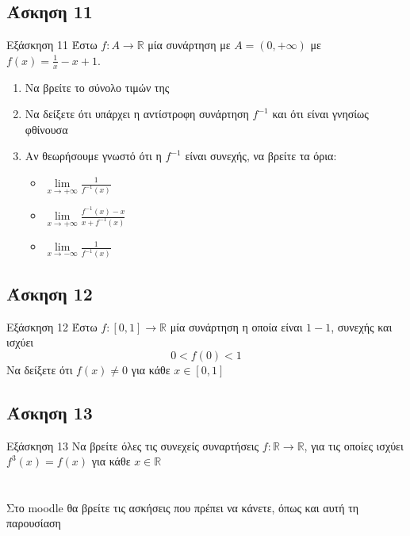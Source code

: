 \documentclass[greek]{beamer}
\begin{document}
\subsection{Άσκηση 11}
\begin{frame}{Εξάσκηση 11}
 Έστω $f:Α\to\mathbb{R}$ μία συνάρτηση με $Α=(0,+\infty)$ με $f(x)=\frac{1}{x}-x+1$.
 \begin{enumerate}
  \item<1-> Να βρείτε το σύνολο τιμών της
  \item<2-> Να δείξετε ότι υπάρχει η αντίστροφη συνάρτηση $f^{-1}$ και ότι είναι γνησίως φθίνουσα
  \item<3-> Αν θεωρήσουμε γνωστό ότι η $f^{-1}$ είναι συνεχής, να βρείτε τα όρια:
        \begin{itemize}
         \item $\lim\limits_{x \to +\infty}{ \frac{1}{f^{-1}(x)} }$
         \item<4-> $\lim\limits_{x \to +\infty}{ \frac{f^{-1}(x)-x}{x+f^{-1}(x)} }$
         \item<5-> $\lim\limits_{x \to -\infty}{ \frac{1}{f^{-1}(x)} }$
        \end{itemize}
 \end{enumerate}
\end{frame}

\subsection{Άσκηση 12}
\begin{frame}{Εξάσκηση 12}
 Έστω $f:[0,1]\to\mathbb{R}$ μία συνάρτηση η οποία είναι $1-1$, συνεχής και ισχύει
 $$0<f(0)<1$$
 Να δείξετε ότι $f(x)\ne 0$ για κάθε $x\in [0,1]$
\end{frame}

\subsection{Άσκηση 13}
\begin{frame}{Εξάσκηση 13}
 Να βρείτε όλες τις συνεχείς συναρτήσεις $f:\mathbb{R}\to\mathbb{R}$, για τις οποίες ισχύει $f^3(x)=f(x)$ για κάθε $x\in\mathbb{R}$
\end{frame}

\section{}
\begin{frame}
 Στο moodle θα βρείτε τις ασκήσεις που πρέπει να κάνετε, όπως και αυτή τη παρουσίαση
\end{frame}
\end{document}
